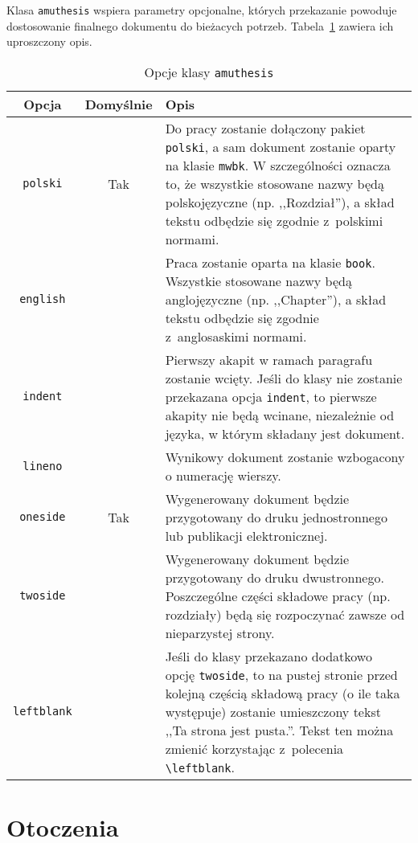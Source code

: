\documentclass[oneside,polski]{amuthesis}
\begin{document}
Klasa \texttt{amuthesis} wspiera parametry opcjonalne, których przekazanie powoduje dostosowanie finalnego dokumentu do bieżacych potrzeb. Tabela~\ref{table:amuthesis-opcje} zawiera ich uproszczony opis.

\begin{table}[p]
  \caption{Opcje klasy \texttt{amuthesis}}
  \label{table:amuthesis-opcje}
  \begin{center}
  \begin{tabular}{ccp{9cm}}
    \toprule
    Opcja & Domyślnie & Opis\\
    \midrule
    \texttt{polski} & Tak & Do pracy zostanie dołączony pakiet \texttt{polski}, a sam dokument zostanie oparty na klasie \texttt{mwbk}. W szczególności oznacza to, że wszystkie stosowane nazwy będą polskojęzyczne (np. ,,Rozdział''), a skład tekstu odbędzie się zgodnie z~polskimi normami.\\
    \midrule
    \texttt{english} & & Praca zostanie oparta na klasie \texttt{book}. Wszystkie stosowane nazwy będą anglojęzyczne (np. ,,Chapter''), a skład tekstu odbędzie się zgodnie z~anglosaskimi normami.\\
    \midrule
    \texttt{indent} & & Pierwszy akapit w ramach paragrafu zostanie wcięty. Jeśli do klasy nie zostanie przekazana opcja \texttt{indent}, to pierwsze akapity nie będą wcinane, niezależnie od języka, w którym składany jest dokument.\\
    \midrule
    \texttt{lineno} & & Wynikowy dokument zostanie wzbogacony o numerację wierszy.\\
    \midrule
    \texttt{oneside} & Tak & Wygenerowany dokument będzie przygotowany do druku jednostronnego lub publikacji elektronicznej.\\
    \midrule
    \texttt{twoside} & & Wygenerowany dokument będzie przygotowany do druku dwustronnego. Poszczególne części składowe pracy (np. rozdziały) będą się rozpoczynać zawsze od nieparzystej strony.\\
    \midrule
    \texttt{leftblank} & & Jeśli do klasy przekazano dodatkowo opcję \texttt{twoside}, to na pustej stronie przed kolejną częścią składową pracy (o ile taka występuje) zostanie umieszczony tekst ,,Ta strona jest pusta.''. Tekst ten można zmienić korzystając z~polecenia \verb`\leftblank`.\\
    \bottomrule
  \end{tabular}
  \end{center}
\end{table}

\section{Otoczenia}
\end{document}
